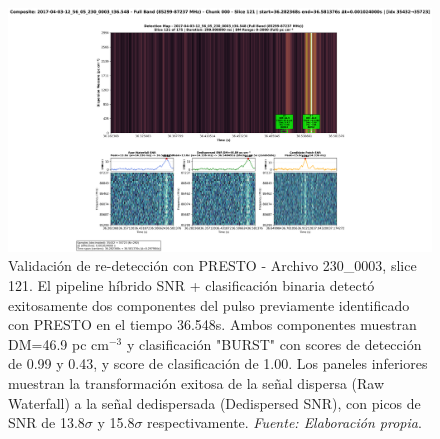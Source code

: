 \begin{figure}[H]
    \centering
    \includegraphics[width=\textwidth]{figures/DRAFTS-HF-SNR/2017-04-03-12_56_05_230_0003_t36.548_slice121.png}
    \caption[Re-detección PRESTO: Archivo 230\_0003, Tiempo 36.548s]{Validación de re-detección con PRESTO - Archivo 230\_0003, slice 121. El pipeline híbrido SNR + clasificación binaria detectó exitosamente dos componentes del pulso previamente identificado con PRESTO en el tiempo 36.548s. Ambos componentes muestran DM=46.9 pc cm$^{-3}$ y clasificación "BURST" con scores de detección de 0.99 y 0.43, y score de clasificación de 1.00. Los paneles inferiores muestran la transformación exitosa de la señal dispersa (Raw Waterfall) a la señal dedispersada (Dedispersed SNR), con picos de SNR de 13.8$\sigma$ y 15.8$\sigma$ respectivamente. \textit{Fuente: Elaboración propia}.}
    \label{fig:alma_presence_validation_1}
\end{figure}

